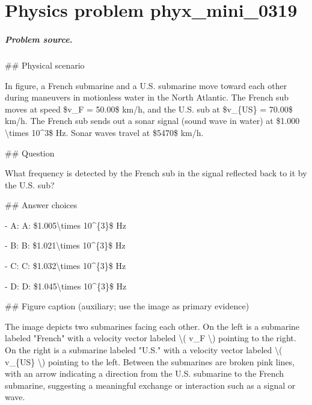 
\chapter{Physics problem phyx\_mini\_0319}
\label{ch:PhyXMiniProblems_problem_phyx_mini_0319}

\paragraph{Problem source.}
\#\# Physical scenario

In figure, a French submarine and a U.S. submarine move toward each other during maneuvers in motionless water in the North Atlantic. The French sub moves at speed \$v\_F = 50.00\$ km/h, and the U.S. sub at \$v\_\{US\} = 70.00\$ km/h. The French sub sends out a sonar signal (sound wave in water) at \$1.000 \textbackslash{}times 10\textasciicircum{}3\$ Hz. Sonar waves travel at \$5470\$ km/h.

\#\# Question

What frequency is detected by the French sub in the signal reflected back to it by the U.S. sub?

\#\# Answer choices

- A: A: \$1.005\textbackslash{}times 10\textasciicircum{}\{3\}\$ Hz

- B: B: \$1.021\textbackslash{}times 10\textasciicircum{}\{3\}\$ Hz

- C: C: \$1.032\textbackslash{}times 10\textasciicircum{}\{3\}\$ Hz

- D: D: \$1.045\textbackslash{}times 10\textasciicircum{}\{3\}\$ Hz

\#\# Figure caption (auxiliary; use the image as primary evidence)

The image depicts two submarines facing each other. On the left is a submarine labeled "French" with a velocity vector labeled \textbackslash{}( v\_F \textbackslash{}) pointing to the right. On the right is a submarine labeled "U.S." with a velocity vector labeled \textbackslash{}( v\_\{US\} \textbackslash{}) pointing to the left. Between the submarines are broken pink lines, with an arrow indicating a direction from the U.S. submarine to the French submarine, suggesting a meaningful exchange or interaction such as a signal or wave.

